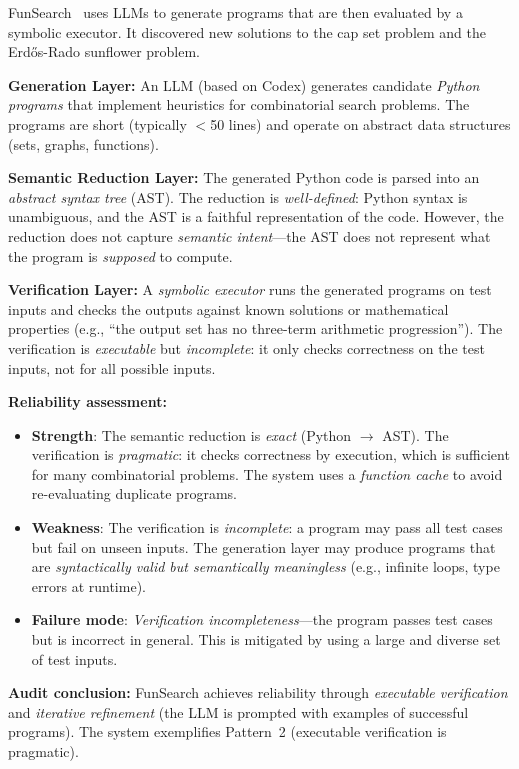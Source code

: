 \documentclass[11pt,a4paper]{article}
\begin{document}
FunSearch~\cite{romera2024mathematical} uses LLMs to generate programs that are then evaluated by a symbolic executor. It discovered new solutions to the cap set problem and the Erd\H{o}s-Rado sunflower problem.

\textbf{Generation Layer:} An LLM (based on Codex) generates candidate \emph{Python programs} that implement heuristics for combinatorial search problems. The programs are short (typically $<$50 lines) and operate on abstract data structures (sets, graphs, functions).

\textbf{Semantic Reduction Layer:} The generated Python code is parsed into an \emph{abstract syntax tree} (AST). The reduction is \emph{well-defined}: Python syntax is unambiguous, and the AST is a faithful representation of the code. However, the reduction does not capture \emph{semantic intent}---the AST does not represent what the program is \emph{supposed} to compute.

\textbf{Verification Layer:} A \emph{symbolic executor} runs the generated programs on test inputs and checks the outputs against known solutions or mathematical properties (e.g., ``the output set has no three-term arithmetic progression''). The verification is \emph{executable} but \emph{incomplete}: it only checks correctness on the test inputs, not for all possible inputs.

\textbf{Reliability assessment:}
\begin{itemize}
  \item \textbf{Strength}: The semantic reduction is \emph{exact} (Python $\to$ AST). The verification is \emph{pragmatic}: it checks correctness by execution, which is sufficient for many combinatorial problems. The system uses a \emph{function cache} to avoid re-evaluating duplicate programs.
  \item \textbf{Weakness}: The verification is \emph{incomplete}: a program may pass all test cases but fail on unseen inputs. The generation layer may produce programs that are \emph{syntactically valid but semantically meaningless} (e.g., infinite loops, type errors at runtime).
  \item \textbf{Failure mode}: \emph{Verification incompleteness}---the program passes test cases but is incorrect in general. This is mitigated by using a large and diverse set of test inputs.
\end{itemize}

\textbf{Audit conclusion:} FunSearch achieves reliability through \emph{executable verification} and \emph{iterative refinement} (the LLM is prompted with examples of successful programs). The system exemplifies Pattern~2 (executable verification is pragmatic).
\end{document}
